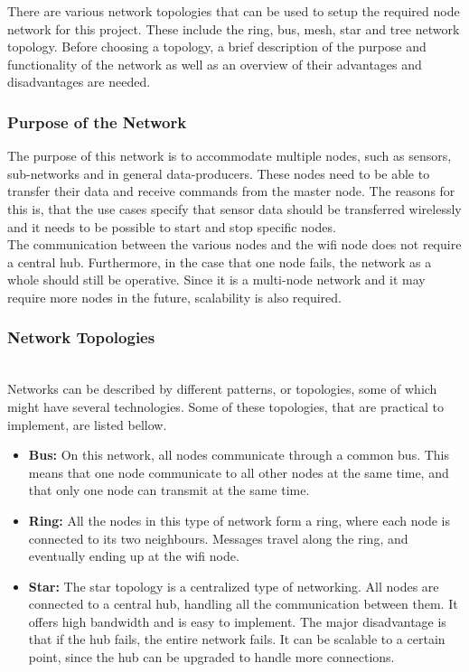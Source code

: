 There are various network topologies that can be used to setup the required node network for this project.
These include the ring, bus, mesh, star and tree network topology. 
Before choosing a topology, a brief description of the purpose and functionality of the network as well as an overview of their advantages and disadvantages are needed. 
\subsubsection{Purpose of the Network}
The purpose of this network is to accommodate multiple nodes, such as sensors, sub-networks and in general data-producers.
These nodes need to be able to transfer their data and receive commands from the master node.
The reasons for this is, that the use cases specify that sensor data should be transferred wirelessly and it needs to be possible to start and stop specific nodes.
\\
The communication between the various nodes and the wifi node does not require a central hub.
Furthermore, in the case that one node fails, the network as a whole should still be operative.
Since it is a multi-node network and it may require more nodes in the future, scalability is also required.

\subsubsection{Network Topologies}~\\
Networks can be described by different patterns, or topologies, some of which might have several technologies.
Some of these topologies, that are practical to implement, are listed bellow.
\begin{itemize}
\item \textbf{Bus:}
On this network, all nodes communicate through a common bus. 
This means that one node communicate to all other nodes at the same time, and that only one node can transmit at the same time.
\item \textbf{Ring:} All the nodes in this type of network form a ring, where each node is connected to its two neighbours.
Messages travel along the ring, and eventually ending up at the wifi node.
\item \textbf{Star:} The star topology is a centralized type of networking.
All nodes are connected to a central hub, handling all the communication between them.
It offers high bandwidth and is easy to implement.
The major disadvantage is that if the hub fails, the entire network fails.
It can be scalable to a certain point, since the hub can be upgraded to handle more connections.
\end{itemize}


